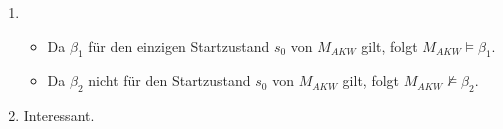 \documentclass[a4paper]{scrartcl}
\begin{document}
\begin{enumerate}
    \item
        \begin{itemize}
            \item Da $\beta_1$ für den einzigen Startzustand $s_0$ von $M_{AKW}$
                gilt, folgt $M_{AKW} \models \beta_1$.
            \item Da $\beta_2$ nicht für den Startzustand $s_0$ von $M_{AKW}$
                gilt, folgt $M_{AKW} \not\models \beta_2$.
        \end{itemize}

    \item Interessant.

\end{enumerate}
\end{document}
